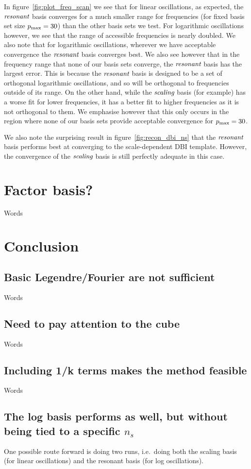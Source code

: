     In figure~\ref{fig:plot_freq_scan} we see that for linear oscillations, as expected,
    the $\textit{resonant}$ basis converges for a much smaller range for frequencies
    (for fixed basis set size $p_\text{max}=30$) than the other basis sets we test.
    For logarithmic oscillations however, we see that the range of accessible
    frequencies is nearly doubled. We also note that for logarithmic oscillations,
    wherever we have acceptable convergence the $\textit{resonant}$ basis converges best.
    We also see however that in the frequency range that none of our basis sets
    converge, the $\textit{resonant}$ basis has the largest error. This is because
    the $\textit{resonant}$ basis is designed to be a set of orthogonal logarithmic
    oscillations, and so will be orthogonal to frequencies outside of its range.
    On the other hand, while the $\textit{scaling}$ basis (for example) has
    a worse fit for lower frequencies, it has a better fit to higher frequencies as
    it is not orthogonal to them. We emphasise however that this only occurs
    in the region where none of our basis sets provide acceptable convergence
    for $p_\text{max}=30$.

    We also note the surprising result in figure~\ref{fig:recon_dbi_ns}
    that the $\textit{resonant}$ basis performs best at converging to the
    scale-dependent DBI template. However, the convergence of the
    $\textit{scaling}$ basis is still perfectly adequate in this case.
    \newpage
\section{Factor basis?}
    Words
\newpage
\section{Conclusion}
    \subsection{Basic Legendre/Fourier are not sufficient}
    Words
    \subsection{Need to pay attention to the cube}
    Words
    \subsection{Including 1/k terms makes the method feasible}
    Words
    \subsection{The log basis performs as well, but without being tied to a specific $n_s$}
    One possible route forward is doing two runs, i.e.\ doing both the scaling basis (for linear oscillations) and the resonant basis (for log oscillations).
